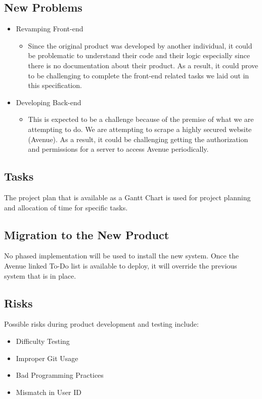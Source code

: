 \documentclass[12pt, titlepage]{article}
\begin{document}
\subsection{New Problems}

\begin{itemize}
\item Revamping Front-end
\begin{itemize}
	\item Since the original product was developed by another individual, it could be problematic to understand their code and their logic especially since there is no documentation about their product. As a result, it could prove to be challenging to complete the front-end related tasks we laid out in this specification.
	\end{itemize}
\item Developing Back-end
\begin{itemize}
	\item This is expected to be a challenge because of the premise of what we are attempting to do. We are attempting to scrape a highly secured website (Avenue). As a result, it could be challenging getting the authorization and permissions for a server to access Avenue periodically.
	\end{itemize}
\end{itemize}

\subsection{Tasks}

The project plan that is available as a Gantt Chart is used for project planning and allocation of time for specific tasks.

\subsection{Migration to the New Product}

No phased implementation will be used to install the new system. Once the Avenue linked To-Do list is available to deploy, it will override the previous system that is in place.

\subsection{Risks}

Possible risks during product development and testing include:
\begin{itemize}
\item Difficulty Testing
\item Improper Git Usage
\item Bad Programming Practices
\item Mismatch in User ID
\end{itemize}
\end{document}
